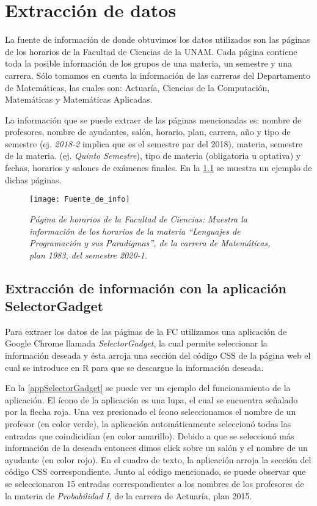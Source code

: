 \chapter{Extracción de datos}

La fuente de información de donde obtuvimos los datos utilizados son las páginas de los horarios de la Facultad de Ciencias de la UNAM. Cada página contiene toda la posible información de los grupos de una materia, un semestre y una carrera. Sólo tomamos en cuenta la información de las carreras del Departamento de Matemáticas, las cuales son: Actuaría, Ciencias de la Computación, Matemáticas y Matemáticas Aplicadas.

La información que se puede extraer de las páginas mencionadas es: nombre de profesores, nombre de ayudantes, salón, horario, plan, carrera, año y tipo de semestre (ej. \textit{2018-2} implica que es el semestre par del 2018), materia, semestre de la materia. (ej. \textit{Quinto Semestre}), tipo de materia (obligatoria u optativa) y fechas, horarios y salones de exámenes finales. En la \figurename{\ref{pagFC}} se muestra un ejemplo de dichas páginas.

\begin{figure}[H]
\centering
\texttt{[image: Fuente\_de\_info]} %
\caption[\textit{Página de horarios de la Facultad de Ciencias}]{\textit{Página de horarios de la Facultad de Ciencias: Muestra la información de los horarios de la materia ``Lenguajes de Programación y sus Paradigmas'', de la carrera de Matemáticas, plan 1983, del semestre 2020-1.}}\label{pagFC}
\end{figure}

\section{Extracción de información con la aplicación SelectorGadget}

Para extraer los datos de las páginas de la FC utilizamos una aplicación de Google Chrome llamada \textit{SelectorGadget}, la cual permite seleccionar la información deseada y ésta arroja una sección del código CSS de la página web el cual se introduce en R para que se descargue la información deseada.

En la \figurename{\ref{appSelectorGadget}} se puede ver un ejemplo del funcionamiento de la aplicación. El ícono de la aplicación es una lupa, el cual se encuentra señalado por la flecha roja. Una vez presionado el ícono seleccionamos el nombre de un profesor (en color verde), la aplicación automáticamente seleccionó todas las entradas que coindicidían (en color amarillo). Debido a que se seleccionó más información de la deseada entonces dimos click sobre un salón y el nombre de un ayudante (en color rojo). En el cuadro de texto, la aplicación arroja la sección del código CSS correspondiente. Junto al código mencionado, se puede observar que se seleccionaron 15 entradas correspondientes a los nombres de los profesores de la materia de \textit{Probabilidad I}, de la carrera de Actuaría, plan 2015.

